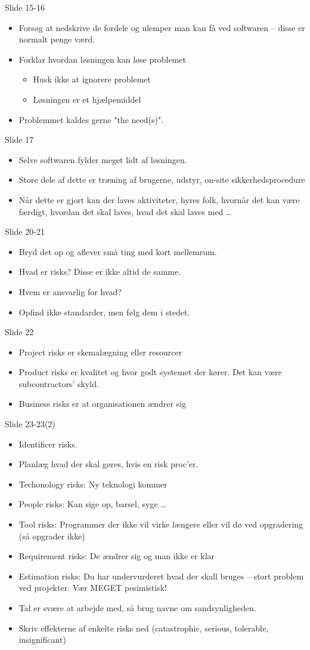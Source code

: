 \documentclass[a4, 10pt]{article}
\begin{document}
Slide 15-16
\begin{itemize}
	\item Forsøg at nedskrive de fordele og ulemper man kan få ved softwaren -- disse er normalt penge værd.
	\item Forklar hvordan løsningen kan løse problemet
	\begin{itemize}
		\item Husk ikke at ignorere problemet
		\item Løsningen er et hjælpemiddel
	\end{itemize}
	\item Problemmet kaldes gerne "the need(s)".
\end{itemize}
Slide 17
\begin{itemize}
	\item Selve softwaren fylder meget lidt af løsningen.
	\item Store dele af dette er træning af brugerne, udstyr, on-site sikkerhedsprocedure
	\item Når dette er gjort kan der laves aktiviteter, hyres folk, hvornår det kan være færdigt, hvordan det skal laves, hvad det skal laves med \dots
\end{itemize}
Slide 20-21
\begin{itemize}
	\item Bryd det op og aflever små ting med kort mellemrum.
	\item Hvad er risks? Disse er ikke altid de samme.
	\item Hvem er ansvarlig for hvad?
	\item Opfind ikke standarder, men følg dem i stedet.
\end{itemize}
Slide 22
\begin{itemize}
	\item Project risks er skemalægning eller resourcer
	\item Product risks er kvalitet og hvor godt systemet der kører. Det kan være subcontractors' skyld.
	\item Business risks er at organisationen ændrer sig
\end{itemize}
Slide 23-23(2)
\begin{itemize}
	\item Identificer risks.
	\item Planlæg hvad der skal gøres, hvis en risk proc'er.
	\item Techonology risks: Ny teknologi kommer
	\item People risks: Kan sige op, barsel, syge \dots
	\item Tool risks: Programmer der ikke vil virke længere eller vil dø ved opgradering (så opgrader ikke)
	\item Requirement risks: De ændrer sig og man ikke er klar
	\item Estimation risks: Du har undervurderet hvad der skall bruges -- stort problem ved projekter. Vær MEGET pesimistisk!
	\item Tal er svære at arbejde med, så brug navne om sandsynligheden.
	\item Skriv effekterne af enkelte risks ned (catastrophic, serious, tolerable, insignificant)
\end{itemize}
\end{document}
